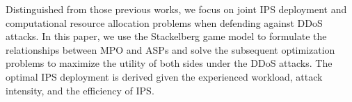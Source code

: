 \documentclass[10pt,journal, compsoc]{IEEEtran}
\begin{document}
Distinguished from those previous works, we focus on joint IPS deployment and computational resource allocation problems when defending against DDoS attacks. In this paper, we use the Stackelberg game model to formulate the relationships between MPO and ASPs and solve the subsequent optimization problems to maximize the utility of both sides under the DDoS attacks. The optimal IPS deployment is derived given the experienced workload, attack intensity, and the efficiency of IPS.
\end{document}
